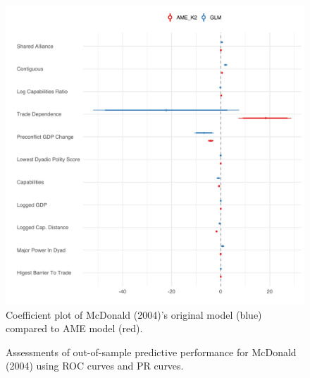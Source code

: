 \begin{figure}
\includegraphics[width=\textwidth]{McDonald_coefs.pdf}
\caption{\label{fig:mcdCoefs}Coefficient plot of McDonald (2004)'s original model (blue) compared to AME model (red).}
\end{figure}

\begin{figure}
\centering   
{}
\caption{\label{fig:mcdall} Assessments of out-of-sample predictive performance for McDonald (2004) using ROC curves and PR curves.}
\end{figure}

